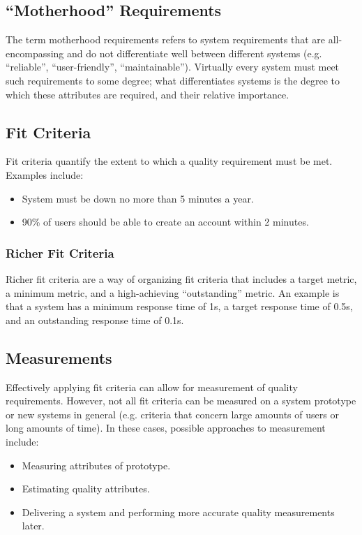 \documentclass[12pt,titlepage]{article}
\begin{document}
    \subsection{``Motherhood'' Requirements}
      The term motherhood requirements refers to system requirements that are all-encompassing and do not differentiate well between different systems
      (e.g. ``reliable'', ``user-friendly'', ``maintainable''). Virtually every system must meet such requirements to some degree; what differentiates
      systems is the degree to which these attributes are required, and their relative importance.

    \subsection{Fit Criteria}
      Fit criteria quantify the extent to which a quality requirement must be met. Examples include:
      \begin{itemize}
        \item System must be down no more than 5 minutes a year.
        \item 90\% of users should be able to create an account within 2 minutes.
      \end{itemize}

      \subsubsection{Richer Fit Criteria}
        Richer fit criteria are a way of organizing fit criteria that includes a target metric, a minimum metric, and a high-achieving ``outstanding''
        metric. An example is that a system has a minimum response time of 1s, a target response time of 0.5s, and an outstanding response time
        of 0.1s.

    \subsection{Measurements}
      Effectively applying fit criteria can allow for measurement of quality requirements. However, not all fit criteria can be measured on a system
      prototype or new systems in general (e.g. criteria that concern large amounts of users or long amounts of time). In these cases, possible approaches
      to measurement include:
      \begin{itemize}
        \item Measuring attributes of prototype.
        \item Estimating quality attributes.
        \item Delivering a system and performing more accurate quality measurements later.
      \end{itemize}
\end{document}
